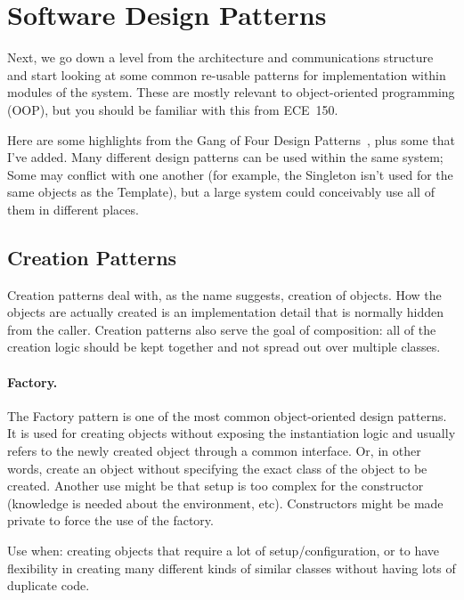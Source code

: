 




\section*{Software Design Patterns}
Next, we go down a level from the architecture and communications structure and start looking at some common re-usable patterns for implementation within modules of the system. These are mostly relevant to object-oriented programming (OOP), but you should be familiar with this from ECE~150.

Here are some highlights from the Gang of Four Design Patterns~\cite{blackwasp, gof}, plus some that I've added. Many different design patterns can be used within the same system; Some may conflict with one another (for example, the Singleton isn't used for the same objects as the Template), but a large system could conceivably use all of them in different places.

\subsection*{Creation Patterns}
Creation patterns deal with, as the name suggests, creation of objects. How the objects are actually created is an implementation detail that is normally hidden from the caller. Creation patterns also serve the goal of composition: all of the creation logic should be kept together and not spread out over multiple classes.

\paragraph{Factory.}
The Factory pattern is one of the most common object-oriented design patterns. It is used for creating objects without exposing the instantiation logic and usually refers to the newly created object through a common interface. Or, in other words, create an object without specifying the exact class of the object to be created. Another use might be that setup is too complex for the constructor (knowledge is needed about the environment, etc). Constructors might be made private to force the use of the factory.

Use when: creating objects that require a lot of setup/configuration, or to have flexibility in creating many different kinds of similar classes without having lots of duplicate code.

